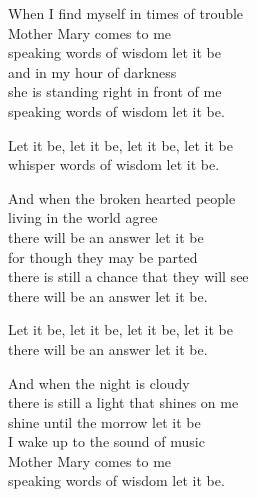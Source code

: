 
\ve{}
When I find myself in times of trouble\\
Mother Mary comes to me\\
speaking words of wisdom let it be  \quad {} \quad {}\\
and in my hour of darkness\\
she is standing right in front of me\\
speaking words of wisdom let it be.  \quad {} \quad {}

Let it be, let it be, let it be, let it be\\
whisper words of wisdom let it be.  \quad {} \quad {} 

\ve{}
And when the broken hearted people\\
living in the world agree\\
there will be an answer let it be\\
for though they may be parted\\
there is still a chance that they will see\\
there will be an answer let it be. 

Let it be, let it be, let it be, let it be\\
there will be an answer let it be. 


\ve{}
And when the night is cloudy\\
there is still a light that shines on me\\
shine until the morrow let it be\\
I wake up to the sound of music\\
Mother Mary comes to me\\
speaking words of wisdom let it be. 


\esong